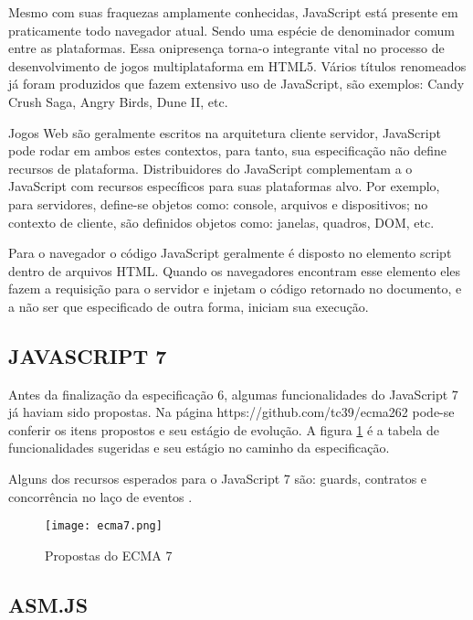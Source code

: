 Mesmo com suas fraquezas amplamente conhecidas, JavaScript está
presente em praticamente todo navegador atual. Sendo uma espécie de
denominador comum entre as plataformas. Essa onipresença torna-o
integrante vital no processo de desenvolvimento de jogos multiplataforma
em HTML5. Vários títulos renomeados já foram produzidos que fazem
extensivo uso de JavaScript, são exemplos: Candy Crush Saga, Angry
Birds, Dune II, etc.

Jogos Web são geralmente escritos na arquitetura cliente servidor,
JavaScript pode rodar em ambos estes contextos, para tanto, sua
especificação não define recursos de plataforma. Distribuidores do
JavaScript complementam a o JavaScript com recursos específicos para
suas plataformas alvo. Por exemplo, para servidores, define-se objetos como:
console, arquivos e dispositivos; no contexto de cliente,
são definidos objetos como: janelas, quadros, DOM, etc.

Para o navegador o código JavaScript geralmente é disposto no elemento
script dentro de arquivos HTML. Quando os navegadores encontram esse
elemento eles fazem a requisição para o servidor e injetam o código
retornado no documento, e a não ser que especificado de outra forma,
iniciam sua execução.

\subsection{JAVASCRIPT 7}

Antes da finalização da especificação 6, algumas funcionalidades
do JavaScript 7 já haviam sido propostas. Na página
https://github.com/tc39/ecma262 pode-se conferir os itens propostos e
seu estágio de evolução. A figura \ref{fig:ecma7} é a tabela de
funcionalidades sugeridas e seu estágio no caminho da especificação.

Alguns dos recursos esperados para o JavaScript 7 são: guards,
contratos e concorrência no laço de eventos \autocite{ecma7}.

\begin{figure}
    \centering
    \texttt{[image: ecma7.png]}
	\caption{Propostas do ECMA 7}
    \label{fig:ecma7}
\end{figure}

\subsection{ASM.JS}%

